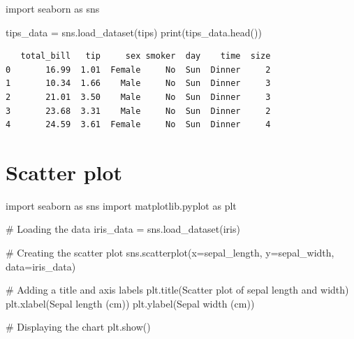 \documentclass[
  english,
  letterpaper,
  DIV=11,
  numbers=noendperiod]{scrreprt}
\newenvironment{Shaded}{\begin{snugshade}}{\end{snugshade}}
\newcommand{\BuiltInTok}[1]{\textcolor[rgb]{0.00,0.23,0.31}{#1}}
\newcommand{\CommentTok}[1]{\textcolor[rgb]{0.37,0.37,0.37}{#1}}
\newcommand{\ImportTok}[1]{\textcolor[rgb]{0.00,0.46,0.62}{#1}}
\newcommand{\NormalTok}[1]{\textcolor[rgb]{0.00,0.23,0.31}{#1}}
\newcommand{\OperatorTok}[1]{\textcolor[rgb]{0.37,0.37,0.37}{#1}}
\newcommand{\StringTok}[1]{\textcolor[rgb]{0.13,0.47,0.30}{#1}}
\begin{document}
\begin{Shaded}
\begin{Highlighting}[]
\ImportTok{import}\NormalTok{ seaborn }\ImportTok{as}\NormalTok{ sns}

\NormalTok{tips\_data }\OperatorTok{=}\NormalTok{ sns.load\_dataset(}\StringTok{\textquotesingle{}tips\textquotesingle{}}\NormalTok{)}
\BuiltInTok{print}\NormalTok{(tips\_data.head())}
\end{Highlighting}
\end{Shaded}

\begin{verbatim}
   total_bill   tip     sex smoker  day    time  size
0       16.99  1.01  Female     No  Sun  Dinner     2
1       10.34  1.66    Male     No  Sun  Dinner     3
2       21.01  3.50    Male     No  Sun  Dinner     3
3       23.68  3.31    Male     No  Sun  Dinner     2
4       24.59  3.61  Female     No  Sun  Dinner     4
\end{verbatim}

\section{Scatter plot}\label{scatter-plot}

\begin{Shaded}
\begin{Highlighting}[]
\ImportTok{import}\NormalTok{ seaborn }\ImportTok{as}\NormalTok{ sns}
\ImportTok{import}\NormalTok{ matplotlib.pyplot }\ImportTok{as}\NormalTok{ plt}

\CommentTok{\# Loading the data}
\NormalTok{iris\_data }\OperatorTok{=}\NormalTok{ sns.load\_dataset(}\StringTok{\textquotesingle{}iris\textquotesingle{}}\NormalTok{)}

\CommentTok{\# Creating the scatter plot}
\NormalTok{sns.scatterplot(x}\OperatorTok{=}\StringTok{\textquotesingle{}sepal\_length\textquotesingle{}}\NormalTok{, y}\OperatorTok{=}\StringTok{\textquotesingle{}sepal\_width\textquotesingle{}}\NormalTok{, data}\OperatorTok{=}\NormalTok{iris\_data)}

\CommentTok{\# Adding a title and axis labels}
\NormalTok{plt.title(}\StringTok{\textquotesingle{}Scatter plot of sepal length and width\textquotesingle{}}\NormalTok{)}
\NormalTok{plt.xlabel(}\StringTok{\textquotesingle{}Sepal length (cm)\textquotesingle{}}\NormalTok{)}
\NormalTok{plt.ylabel(}\StringTok{\textquotesingle{}Sepal width (cm)\textquotesingle{}}\NormalTok{)}

\CommentTok{\# Displaying the chart}
\NormalTok{plt.show()}
\end{Highlighting}
\end{Shaded}
\end{document}
